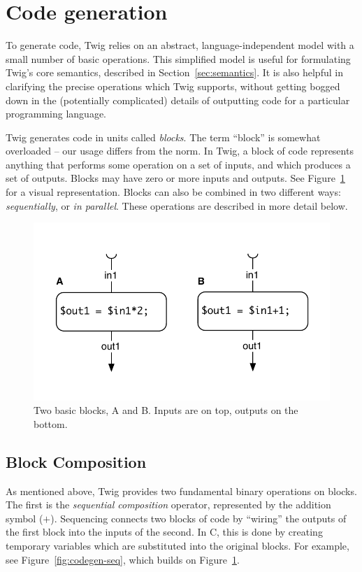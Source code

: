
\section{Code generation}
\label{sec:code-gen}

To generate code, Twig relies on an abstract, language-independent model with a small number of basic operations. This simplified model is useful for formulating Twig's core semantics, described in Section~\ref{sec:semantics}. It is also helpful in clarifying the precise operations which Twig supports, without getting bogged down in the (potentially complicated) details of outputting code for a particular programming language.

Twig generates code in units called \emph{blocks}. The term ``block'' is somewhat overloaded -- our usage differs from the norm. In Twig, a block of code represents anything that performs some operation on a set of inputs, and which produces a set of outputs. Blocks may have zero or more inputs and outputs. See Figure~\ref{fig:blocks} for a visual representation. Blocks can also be combined in two different ways: \emph{sequentially}, or \emph{in parallel}. These operations are described in more detail below.

\begin{figure}[ht]
\centering
\includegraphics[width=0.75\columnwidth]{images/code-gen1}
\caption{Two basic blocks, A and B. Inputs are on top, outputs on the bottom.}
\label{fig:blocks}
\end{figure}

\subsection{Block Composition}

As mentioned above, Twig provides two fundamental binary operations on blocks. The first is the \emph{sequential composition} operator, represented by the addition symbol ($+$). Sequencing connects two blocks of code by ``wiring'' the outputs of the first block into the inputs of the second. In C, this is done by creating temporary variables which are substituted into the original blocks. For example, see Figure~\ref{fig:codegen-seq}, which builds on Figure~\ref{fig:blocks}.

